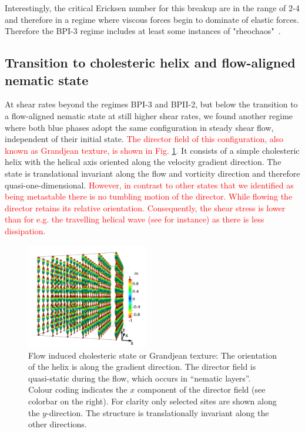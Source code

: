\documentclass[8.5pt,twoside,twocolumn]{article}
\newcommand{\rev}[1]{{\textcolor{red}{#1}}}
\begin{document}
Interestingly, the critical Ericksen number for this breakup are in 
the range of 2-4 and therefore in a regime where viscous forces begin to 
dominate of elastic forces. 
Therefore the BPI-3 regime includes at least some instances of "rheochaos"~\cite{rheochaos,Cates:2002}.


\subsection{Transition to cholesteric helix and flow-aligned nematic state}\label{gj-fan}

At shear rates beyond the regimes BPI-3 and BPII-2, but below the transition to a 
flow-aligned nematic state at still higher shear rates, we found another regime where 
both blue phases adopt the same configuration in steady shear flow, 
independent of their initial state.
\rev{
The director field of this configuration, also known as
Grandjean texture, is shown in Fig. \ref{grandjean}.
}
It consists of a simple cholesteric helix with the helical axis oriented 
along the velocity gradient direction. The state is translational invariant 
along the flow and vorticity direction and therefore quasi-one-dimensional. 
\rev{
However, in contrast to other states that we identified as being metastable
there is no tumbling motion of the director. 
While flowing the director retains its relative orientation.
Consequently, the shear stress is lower than for
e.g. the travelling helical wave (see \cite{Rey:1996a, Rey:1996b} for instance)
as there is less dissipation.
} 

\begin{figure}[htpb]
\includegraphics[width=0.475\textwidth]{dir3d+y-200k_run1179r.png}
\caption{Flow induced cholesteric state or Grandjean texture: 
The orientation of the helix is along the gradient direction. 
The director field is quasi-static during the flow, which occurs 
in ``nematic layers''. Colour coding indicates the 
$x$ component of the director field (see colorbar on the right).
For clarity only selected sites are shown along the $y$-direction.
The structure is translationally invariant along the other directions.}
\label{grandjean}
\end{figure}
\end{document}
